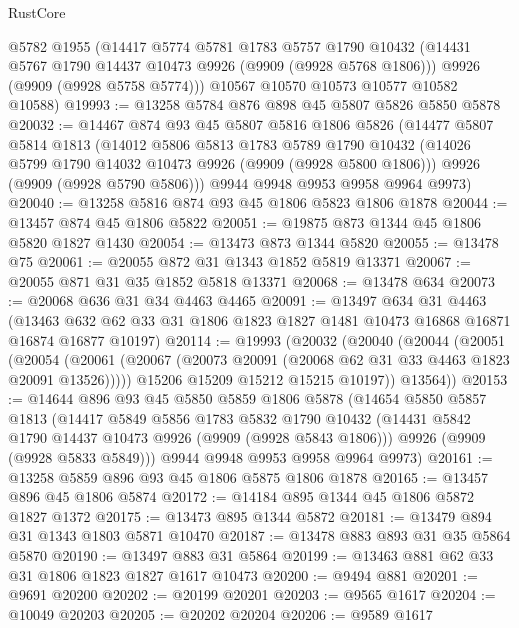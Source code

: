 \begin{lexlean}{RustCore}
\begin{coremodule}
      @5782
      @1955
      (@14417
        @5774
        @5781
        @1783
        @5757
        @1790
        @10432
        (@14431 @5767 @1790 @14437 @10473 @9926 (@9909 (@9928 @5768 @1806)))
        @9926
        (@9909 (@9928 @5758 @5774)))
      @10567
      @10570
      @10573
      @10577
      @10582
      @10588)
@19993 := @13258 @5784 @876 @898 @45 @5807 @5826 @5850 @5878
@20032 := @14467
    @874
    @93
    @45
    @5807
    @5816
    @1806
    @5826
    (@14477
      @5807
      @5814
      @1813
      (@14012
        @5806
        @5813
        @1783
        @5789
        @1790
        @10432
        (@14026 @5799 @1790 @14032 @10473 @9926 (@9909 (@9928 @5800 @1806)))
        @9926
        (@9909 (@9928 @5790 @5806)))
      @9944
      @9948
      @9953
      @9958
      @9964
      @9973)
@20040 := @13258 @5816 @874 @93 @45 @1806 @5823 @1806 @1878
@20044 := @13457 @874 @45 @1806 @5822
@20051 := @19875 @873 @1344 @45 @1806 @5820 @1827 @1430
@20054 := @13473 @873 @1344 @5820
@20055 := @13478 @75
@20061 := @20055 @872 @31 @1343 @1852 @5819 @13371
@20067 := @20055 @871 @31 @35 @1852 @5818 @13371
@20068 := @13478 @634
@20073 := @20068 @636 @31 @34 @4463 @4465
@20091 := @13497
    @634
    @31
    @4463
    (@13463 @632 @62 @33 @31 @1806 @1823 @1827 @1481 @10473 @16868 @16871 @16874 @16877 @10197)
@20114 := @19993
    (@20032
      (@20040
        (@20044
          (@20051
            (@20054
              (@20061 (@20067 (@20073 @20091 (@20068 @62 @31 @33 @4463 @1823 @20091 @13526)))))
            @15206
            @15209
            @15212
            @15215
            @10197))
        @13564))
@20153 := @14644
    @896
    @93
    @45
    @5850
    @5859
    @1806
    @5878
    (@14654
      @5850
      @5857
      @1813
      (@14417
        @5849
        @5856
        @1783
        @5832
        @1790
        @10432
        (@14431 @5842 @1790 @14437 @10473 @9926 (@9909 (@9928 @5843 @1806)))
        @9926
        (@9909 (@9928 @5833 @5849)))
      @9944
      @9948
      @9953
      @9958
      @9964
      @9973)
@20161 := @13258 @5859 @896 @93 @45 @1806 @5875 @1806 @1878
@20165 := @13457 @896 @45 @1806 @5874
@20172 := @14184 @895 @1344 @45 @1806 @5872 @1827 @1372
@20175 := @13473 @895 @1344 @5872
@20181 := @13479 @894 @31 @1343 @1803 @5871 @10470
@20187 := @13478 @883 @893 @31 @35 @5864 @5870
@20190 := @13497 @883 @31 @5864
@20199 := @13463 @881 @62 @33 @31 @1806 @1823 @1827 @1617 @10473
@20200 := @9494 @881
@20201 := @9691 @20200
@20202 := @20199 @20201
@20203 := @9565 @1617
@20204 := @10049 @20203
@20205 := @20202 @20204
@20206 := @9589 @1617

\end{coremodule}
\end{lexlean}

